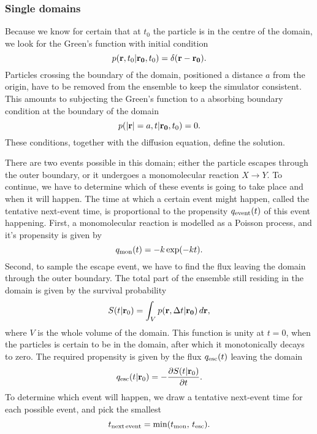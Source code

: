 \subsubsection{Single domains}
Because we know for certain that at $t_0$ the particle is in the centre of the domain, we look for the Green's function with initial condition
\begin{equation}
 p({\bf r}, t_0|{\bf r_0},t_0) = \delta(\mathbf{r - r_0}).
\end{equation}
Particles crossing the boundary of the domain, positioned a distance $a$ from the origin, have to be removed from the ensemble to keep the simulator consistent. This amounts to subjecting the Green's function to a absorbing boundary condition at the boundary of the domain
\begin{equation}
 p({\bf |r|}=a, t|{\bf r_0},t_0) = 0.
\end{equation}
These conditions, together with the diffusion equation, define the solution. \cite{Carslaw1959}\cite{Beck1992} 

There are two events possible in this domain; either the particle escapes through the outer boundary, or it undergoes a monomolecular reaction $X\rightarrow Y$. To continue, we have to determine which of these events is going to take place and when it will happen. The time at which a certain event might happen, called the tentative next-event time, is proportional to the propensity $q_{\rm event}(t)$ of this event happening. First, a monomolecular reaction is modelled as a Poisson process, and it's propensity is given by
\begin{equation}
 q_{\rm mon}(t) = -k\, {\rm exp}(-k t).
\end{equation}
Second, to sample the escape event, we have to find the flux leaving the domain through the outer boundary. The total part of the ensemble still residing in the domain is given by the survival probability
\begin{equation}
 S(t|{\mathbf r_0}) = \int_V p({\bf r}, \Delta t|{\bf r_0}) \, d{\mathbf r},
 \elabel{Surv}
\end{equation}
where $V$ is the whole volume of the domain. This function is unity at $t=0$, when the particles is certain to be in the domain, after which it monotonically decays to zero. The required propensity is given by the flux $q_{\rm esc}(t)$ leaving the domain
\begin{equation}
 q_{\rm esc}(t|{\mathbf r_0}) = -\pdiff{S(t|{\mathbf r_0})}{t}.
 \elabel{Sflux}
\end{equation}
To determine which event will happen, we draw a tentative next-event time for each possible event, and pick the smallest
\begin{equation}
 t_{\rm next\,event} = {\rm min}(t_{\rm mon},\,t_{\rm esc}).
\end{equation}

